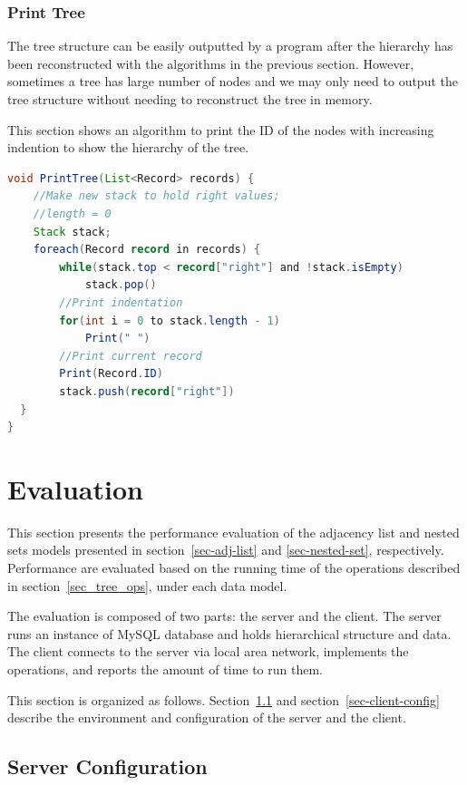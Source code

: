 \subsubsection{Print Tree}

The tree structure can be easily outputted by a program after the hierarchy has been reconstructed with the algorithms in the previous section. However, sometimes a tree has large number of nodes and we may only need to output the tree structure without needing to reconstruct the tree in memory.

This section shows an algorithm to print the ID of the nodes with increasing indention to show the hierarchy of the tree.

\begin{lstlisting}[language=java,caption={Tree reconstruction using Left and Right value},label=ns_print_tree, float]
void PrintTree(List<Record> records) {
	//Make new stack to hold right values; 
	//length = 0
	Stack stack;
	foreach(Record record in records) {
		while(stack.top < record["right"] and !stack.isEmpty)
			stack.pop()
		//Print indentation
		for(int i = 0 to stack.length - 1) 
			Print(" ")
		//Print current record
		Print(Record.ID)
		stack.push(record["right"])
  }
}
\end{lstlisting}

\section{Evaluation}

This section presents the performance evaluation of the adjacency list and nested sets models presented in section~\ref{sec-adj-list} and \ref{sec-nested-set}, respectively. Performance are evaluated based on the running time of the operations described in section~\ref{sec_tree_ops}, under each data model.

The evaluation is composed of two parts: the server and the client. The server runs an instance of MySQL database and holds hierarchical structure and data. The client connects to the server via local area network, implements the operations, and reports the amount of time to run them.

This section is organized as follows. Section~\ref{sec-server-config} and section~\ref{sec-client-config} describe the environment and configuration of the server and the client.

\subsection{Server Configuration}\label{sec-server-config}

